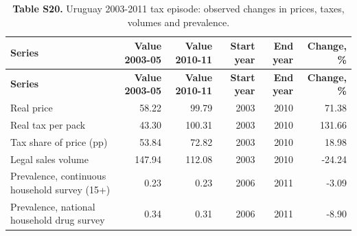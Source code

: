 \scriptsize
\begin{longtable}{lrrrrr}
\caption{\textbf{Table S20.} Uruguay 2003-2011 tax episode: observed changes in prices, taxes, volumes and prevalence.}\\
\toprule
\textbf{Series} & \textbf{Value 2003-05} & \textbf{Value 2010-11} & \textbf{Start year} & \textbf{End year} & \textbf{Change, \%} \\
\midrule
\endfirsthead
\toprule
\textbf{Series} & \textbf{Value 2003-05} & \textbf{Value 2010-11} & \textbf{Start year} & \textbf{End year} & \textbf{Change, \%} \\
\midrule
\endhead
\bottomrule
\endfoot
Real price & 58.22 & 99.79 & 2003 & 2010 & 71.38 \\
Real tax per pack & 43.30 & 100.31 & 2003 & 2010 & 131.66 \\
Tax share of price (pp) & 53.84 & 72.82 & 2003 & 2010 & 18.98 \\
Legal sales volume & 147.94 & 112.08 & 2003 & 2010 & -24.24 \\
Prevalence, continuous household survey (15+) & 0.23 & 0.23 & 2006 & 2011 & -3.09 \\
Prevalence, national household drug survey & 0.34 & 0.31 & 2006 & 2011 & -8.90 \\
\end{longtable}
\normalsize
